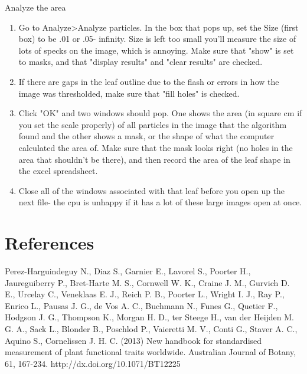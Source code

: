 \documentclass[11pt]{article}
\begin{document}
Analyze the area
\begin{enumerate}
\item{Go to Analyze\textgreater Analyze particles. In the box that pops up, set the Size (first box)
to be .01 or .05- infinity. Size is left too small you'll measure the size of lots of specks on the image, which is annoying. Make sure that "show" is set to masks, and that "display results" and "clear results" are checked.}
\item{If there are gaps in the leaf outline due to the flash or errors in how the image was thresholded, make sure that "fill holes" is checked.}
\item{Click "OK" and two windows should pop. One shows the area (in square cm if you set the scale properly) of all particles in the image that the algorithm found and the other shows a mask, or the shape of what the computer calculated the area of. Make sure that the mask looks right (no holes in the area that shouldn't be there), and then record the area of the leaf shape in the excel spreadsheet.}
\item{Close all of the windows associated with that leaf before you open up the next file- the cpu is unhappy if it has a lot of these large images open at once.}
\end{enumerate}

\section*{References}

Perez-Harguindeguy N., Diaz S., Garnier E., Lavorel S., Poorter H., Jaureguiberry P., Bret-Harte M. S., Cornwell W. K., Craine J. M., Gurvich D. E., Urcelay C., Veneklaas E. J., Reich P. B., Poorter L., Wright I. J., Ray P., Enrico L., Pausas J. G., de Vos A. C., Buchmann N., Funes G., Quetier F., Hodgson J. G., Thompson K., Morgan H. D., ter Steege H., van der Heijden M. G. A., Sack L., Blonder B., Poschlod P., Vaieretti M. V., Conti G., Staver A. C., Aquino S., Cornelissen J. H. C. (2013) New handbook for standardised measurement of plant functional traits worldwide. Australian Journal of Botany, 61, 167-234. http://dx.doi.org/10.1071/BT12225
\end{document}
